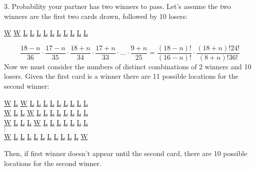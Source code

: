 \documentclass[11pt]{article}
\begin{document}
3. Probability your partner has two winners to pass. Let's assume the two winners are the first two cards drawn, followed by 10 losers:\\
\begin {center}
\underline{W} \underline{W} \underline{L} \underline{L} \underline{L} \underline{L} \underline{L} \underline{L} \underline{L} \underline{L} \underline{L} \underline{L}
\end {center}
\begin {equation}
\frac{18-n}{36}\cdot \frac{17-n}{35}\cdot \frac{18+n}{34} \cdot \frac{17+n}{33}\cdot ...\cdot \frac {9+n}{25}=\frac{(18-n)!}{(16-n)!}\cdot \frac{(18+n)!24!}{(8+n)!36!}
\end{equation}
Now we must consider the numbers of distinct combinations of 2 winners and 10 losers. Given the first card is a winner there are 11 possible locations for the second winner:
\begin {center}
  \underline{W} \underline{L} \underline{W} \underline{L} \underline{L} \underline{L} \underline{L} \underline{L} \underline{L} \underline{L} \underline{L} \underline{L}\\
  \underline{W} \underline{L} \underline{L} \underline{W} \underline{L} \underline{L} \underline{L} \underline{L} \underline{L} \underline{L} \underline{L} \underline{L}\\
  \underline{W} \underline{L} \underline{L} \underline{L} \underline{W} \underline{L} \underline{L} \underline{L} \underline{L} \underline{L} \underline{L} \underline{L}\\
 $\vdots$ \\
   \underline{W} \underline{L} \underline{L} \underline{L} \underline{L} \underline{L} \underline{L} \underline{L} \underline{L} \underline{L} \underline{L} \underline{W}\\
\end {center}
Then, if first winner doesn't appear until the second card, there are 10 possible locations for the second winner. 
\end{document}
